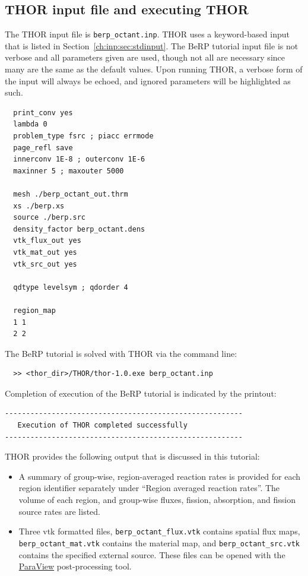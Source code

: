 \subsection{THOR input file and executing THOR}

The \ac{THOR} input file is \verb"berp_octant.inp".
\ac{THOR} uses a keyword-based input that is listed in Section~\ref{ch:inp:sec:stdinput}.
The BeRP tutorial input file is not verbose and all parameters given are used, though not all are necessary since many are the same as the default values.
Upon running \ac{THOR}, a verbose form of the input will always be echoed, and ignored parameters will be highlighted as such.
\begin{verbatim}
  print_conv yes
  lambda 0
  problem_type fsrc ; piacc errmode
  page_refl save
  innerconv 1E-8 ; outerconv 1E-6
  maxinner 5 ; maxouter 5000

  mesh ./berp_octant_out.thrm
  xs ./berp.xs
  source ./berp.src
  density_factor berp_octant.dens
  vtk_flux_out yes
  vtk_mat_out yes
  vtk_src_out yes

  qdtype levelsym ; qdorder 4

  region_map
  1 1
  2 2
\end{verbatim}

The BeRP tutorial is solved with \ac{THOR} via the command line:
\begin{verbatim}
  >> <thor_dir>/THOR/thor-1.0.exe berp_octant.inp
\end{verbatim}

Completion of execution of the BeRP tutorial is indicated by the printout:
\begin{verbatim}
--------------------------------------------------------
   Execution of THOR completed successfully
--------------------------------------------------------
\end{verbatim}

\ac{THOR} provides the following output that is discussed in this tutorial:
\begin{itemize}
    \item A summary of group-wise, region-averaged reaction rates is provided for each region identifier separately under ``Region averaged reaction rates''.
    The volume of each region, and group-wise fluxes, fission, absorption, and fission source rates are listed.
    \item Three vtk formatted files, \verb"berp_octant_flux.vtk" contains spatial flux maps, \\
    \verb"berp_octant_mat.vtk" contains the material map, and \verb"berp_octant_src.vtk" contains the specified external source.
    These files can be opened with the \href{https://www.paraview.org/download/}{ParaView} post-processing tool.
\end{itemize}

